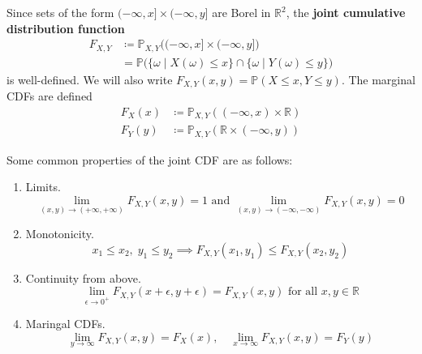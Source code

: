  \begin{definition}
    \label{def:joint-cumulative-distribution-function}
    Since sets of the form $(-\infty, x] \times (-\infty, y]$ are Borel in $\mathbb{R}^2$, the \textbf{joint cumulative distribution function} 
    \begin{align*}
      F_{X, Y} & \coloneqq \mathbb{P}_{X, Y} \big( (-\infty, x] \times (-\infty, y] \big) \\
      & = \mathbb{P} \big( \{\omega \mid X(\omega) \leq x\} \cap \{ \omega \mid Y(\omega) \leq y\} \big)
    \end{align*}
    is well-defined. We will also write $F_{X, Y} (x, y) = \mathbb{P}(X \leq x, Y \leq y)$. The marginal CDFs are defined 
    \begin{align*}
      F_X (x) & \coloneqq \mathbb{P}_{X, Y} ((-\infty, x) \times \mathbb{R}) \\
      F_Y (y) & \coloneqq \mathbb{P}_{X, Y} (\mathbb{R} \times (-\infty, y))
    \end{align*}
  \end{definition}

  \begin{lemma}
    \label{thm:properties-of-joint-cdf}
    Some common properties of the joint CDF are as follows: 
    \begin{enumerate}
      \item Limits. 
      \begin{equation}
        \lim_{(x, y) \rightarrow (+\infty, +\infty)} F_{X, Y} (x, y) = 1 \text{ and } \lim_{(x, y) \rightarrow (-\infty, -\infty)} F_{X, Y} (x, y) = 0
      \end{equation}
      \item Monotonicity. 
      \begin{equation}
        x_1 \leq x_2, \; y_1 \leq y_2 \implies F_{X, Y} (x_1, y_1) \leq F_{X, Y}(x_2, y_2)
      \end{equation}
      \item Continuity from above. 
      \begin{equation}
        \lim_{\epsilon \rightarrow 0^+} F_{X, Y} (x + \epsilon, y + \epsilon) = F_{X, Y} (x, y) \text{ for all } x, y \in \mathbb{R}
      \end{equation}
      \item Maringal CDFs. 
      \begin{equation}
        \lim_{y \rightarrow \infty} F_{X, Y} (x, y) = F_X (x), \quad \lim_{x \rightarrow \infty} F_{X, Y} (x, y) = F_Y (y)
      \end{equation}
    \end{enumerate}
  \end{lemma}

